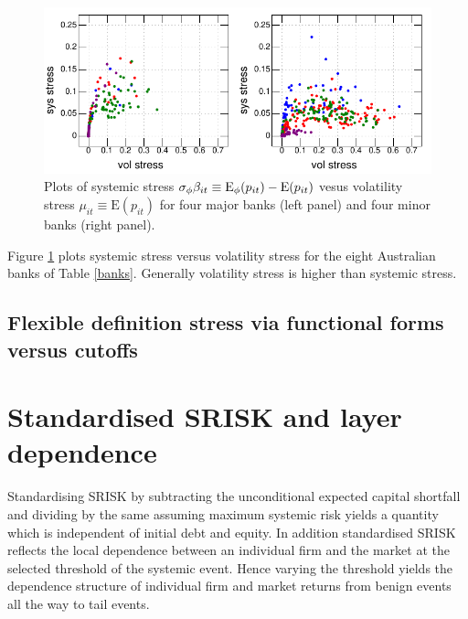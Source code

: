 \documentclass[authoryear]{elsarticle}
\newcommand{\E}{\mathrm{E}}
\newcommand{\fref}[1]{Figure \ref{#1}}
\newcommand{\tref}[1]{Table \ref{#1}}
\begin{document}
\begin{figure}[htbp]
\begin{center}
\includegraphics{betaitmuit.pdf}
\caption{Plots of systemic stress $\sigma_\phi\beta_{it}\equiv \Es(p_{it})-\E(p_{it})$  vesus volatility stress  $\mu_{it}\equiv\E(p_{it})$   for four major banks (left panel) and four minor banks (right panel).}
\label{betaitmuit}
\end{center}
\end{figure}

\fref{betaitmuit} plots systemic stress versus volatility stress for the eight Australian banks of \tref{banks}.   Generally volatility stress is higher than systemic stress.

\subsection{Flexible definition stress via functional forms versus cutoffs}

\section{Standardised SRISK and layer dependence}

Standardising SRISK by subtracting the unconditional expected capital shortfall and dividing by the same assuming maximum systemic risk yields a quantity which is independent of initial debt and equity. In addition standardised SRISK reflects the local dependence between an individual firm and the market at the selected threshold of the systemic event. Hence varying the threshold yields the dependence structure of individual firm and market returns from benign events all the way to tail events.
\end{document}
